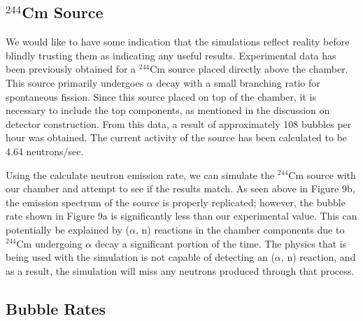 \documentclass[%
12pt,
twoside,
reprint,
amsmath,amssymb,
aps,
]{article}
\begin{document}
	\subsection{$^{244}$Cm Source}
	\par We would like to have some indication that the simulations reflect reality before blindly trusting them as indicating any useful results. Experimental data has been previously obtained for a $^{244}$Cm source placed directly above the chamber. This source primarily undergoes $\alpha$ decay with a small branching ratio for spontaneous fission. Since this source placed on top of the chamber, it is necessary to include the top components, as mentioned in the discussion on detector construction. From this data, a result of approximately 108 bubbles per hour was obtained. The current activity of the source has been calculated to be 4.64 neutrons/sec.
	\par Using the calculate neutron emission rate, we can simulate the $^{244}$Cm source with our chamber and attempt to see if the results match. As seen above in Figure 9b, the emission spectrum of the source is properly replicated; however, the bubble rate shown in Figure 9a is significantly less than our experimental value. This can potentially be explained by ($\alpha$, n) reactions in the chamber components due to $^{244}$Cm undergoing $\alpha$ decay a significant portion of the time. The physics that is being used with the simulation is not capable of detecting an ($\alpha$, n) reaction, and as a result, the simulation will miss any neutrons produced through that process.
	
	\subsection{Bubble Rates}
\end{document}
